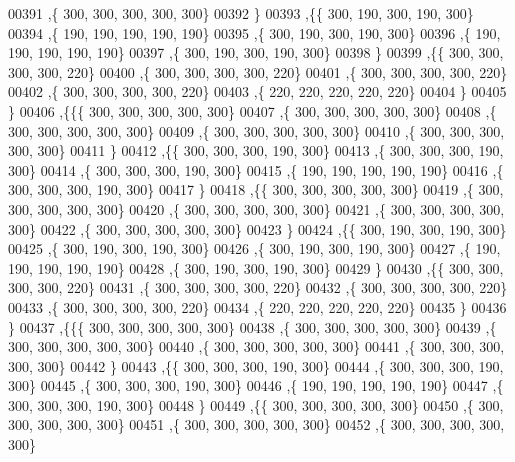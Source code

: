 \begin{DoxyCode}
00391    ,\{   300,   300,   300,   300,   300\}
00392    \}
00393   ,\{\{   300,   190,   300,   190,   300\}
00394    ,\{   190,   190,   190,   190,   190\}
00395    ,\{   300,   190,   300,   190,   300\}
00396    ,\{   190,   190,   190,   190,   190\}
00397    ,\{   300,   190,   300,   190,   300\}
00398    \}
00399   ,\{\{   300,   300,   300,   300,   220\}
00400    ,\{   300,   300,   300,   300,   220\}
00401    ,\{   300,   300,   300,   300,   220\}
00402    ,\{   300,   300,   300,   300,   220\}
00403    ,\{   220,   220,   220,   220,   220\}
00404    \}
00405   \}
00406  ,\{\{\{   300,   300,   300,   300,   300\}
00407    ,\{   300,   300,   300,   300,   300\}
00408    ,\{   300,   300,   300,   300,   300\}
00409    ,\{   300,   300,   300,   300,   300\}
00410    ,\{   300,   300,   300,   300,   300\}
00411    \}
00412   ,\{\{   300,   300,   300,   190,   300\}
00413    ,\{   300,   300,   300,   190,   300\}
00414    ,\{   300,   300,   300,   190,   300\}
00415    ,\{   190,   190,   190,   190,   190\}
00416    ,\{   300,   300,   300,   190,   300\}
00417    \}
00418   ,\{\{   300,   300,   300,   300,   300\}
00419    ,\{   300,   300,   300,   300,   300\}
00420    ,\{   300,   300,   300,   300,   300\}
00421    ,\{   300,   300,   300,   300,   300\}
00422    ,\{   300,   300,   300,   300,   300\}
00423    \}
00424   ,\{\{   300,   190,   300,   190,   300\}
00425    ,\{   300,   190,   300,   190,   300\}
00426    ,\{   300,   190,   300,   190,   300\}
00427    ,\{   190,   190,   190,   190,   190\}
00428    ,\{   300,   190,   300,   190,   300\}
00429    \}
00430   ,\{\{   300,   300,   300,   300,   220\}
00431    ,\{   300,   300,   300,   300,   220\}
00432    ,\{   300,   300,   300,   300,   220\}
00433    ,\{   300,   300,   300,   300,   220\}
00434    ,\{   220,   220,   220,   220,   220\}
00435    \}
00436   \}
00437  ,\{\{\{   300,   300,   300,   300,   300\}
00438    ,\{   300,   300,   300,   300,   300\}
00439    ,\{   300,   300,   300,   300,   300\}
00440    ,\{   300,   300,   300,   300,   300\}
00441    ,\{   300,   300,   300,   300,   300\}
00442    \}
00443   ,\{\{   300,   300,   300,   190,   300\}
00444    ,\{   300,   300,   300,   190,   300\}
00445    ,\{   300,   300,   300,   190,   300\}
00446    ,\{   190,   190,   190,   190,   190\}
00447    ,\{   300,   300,   300,   190,   300\}
00448    \}
00449   ,\{\{   300,   300,   300,   300,   300\}
00450    ,\{   300,   300,   300,   300,   300\}
00451    ,\{   300,   300,   300,   300,   300\}
00452    ,\{   300,   300,   300,   300,   300\}

\end{DoxyCode}

